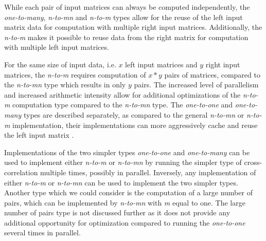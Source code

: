 While each pair of input matrices can always be computed independently, the \textit{one-to-many}, \textit{n-to-mn} and \textit{n-to-m} types allow for the reuse of the left input matrix data for computation with multiple right input matrices.
Additionally, the \textit{n-to-m} makes it possible to reuse data from the right matrix for computation with multiple left input matrices. 

For the same size of input data, i.e. $x$ left input matrices and $y$ right input matrices, the \textit{n-to-m} requires computation of $x*y$ pairs of matrices, compared to the \textit{n-to-mn} type which results in only $y$ pairs. The increased level of parallelism and increased arithmetic intensity allow for additional optimizations of the \textit{n-to-m} computation type compared to the \textit{n-to-mn} type. The \textit{one-to-one} and \textit{one-to-many} types are described separately, as compared to the general \textit{n-to-mn} or \textit{n-to-m} implementation, their implementations can more aggressively cache and reuse the left input matrix . 

Implementations of the two simpler types \textit{one-to-one} and \textit{one-to-many} can be used to implement either \textit{n-to-m} or \textit{n-to-mn} by running the simpler type of cross-correlation multiple times, possibly in parallel. Inversely, any implementation of either \textit{n-to-m} or \textit{n-to-mn} can be used to implement the two simpler types. Another type which we could consider is the computation of a large number of pairs, which can be implemented by \textit{n-to-mn} with \textit{m} equal to one. The large number of pairs type is not discussed further as it does not provide any additional opportunity for optimization compared to running the \textit{one-to-one} several times in parallel.

